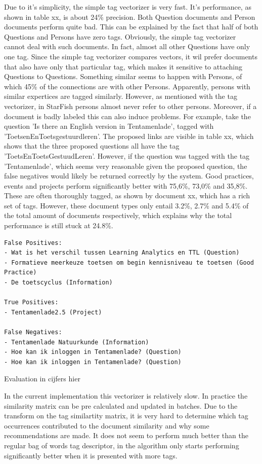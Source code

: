 Due to it's simplicity, the simple tag vectorizer is very fast. It's performance, as shown in table xx, is about 24\% precision. Both Question documents and Person documents perform quite bad. This can be explained by the fact that half of both Questions and Persons have zero tags. Obviously, the simple tag vectorizer cannot deal with such documents. In fact, almost all other Questions have only one tag. Since the simple tag vectorizer compares vectors, it wil prefer documents that also have only that particular tag, which makes it sensitive to attaching Questions to Questions. Something similar seems to happen with Persons, of which 45\% of the connections are with other Persons. Apparently, persons with similar expertices are tagged similarly. However, as mentioned with the tag vectorizer, in StarFish persons almost never refer to other persons. Moreover, if a document is badly labeled this can also induce problems. For example, take the question 'Is there an English version in Tentamenlade', tagged with 'ToetsenEnToetsgestuurdleren'. The proposed links are visible in table xx, which shows that  the three proposed questions all have the tag 'ToetsEnToetsGestuudLeren'. However, if the question was tagged with the tag 'Tentamenlade', which seems very reasonable given the proposed question, the false negatives would likely be returned correctly by the system. Good practices, events and projects perform significantly better with 75,6\%, 73,0\% and 35,8\%. These are often thoroughly tagged, as shown by document xx, which has a rich set of tags. However, these document types only entail 3.2\%, 2.7\% and 5.4\% of the total amount of documents respectively, which explains why the total performance is still stuck at 24.8\%. 

\begin{lstlisting}
False Positives:
- Wat is het verschil tussen Learning Analytics en TTL (Question)
- Formatieve meerkeuze toetsen om begin kennisniveau te toetsen (Good Practice)
- De toetscyclus (Information)

True Positives:
- Tentamenlade2.5 (Project)

False Negatives:
- Tentamenlade Natuurkunde (Information)
- Hoe kan ik inloggen in Tentamenlade? (Question)
- Hoe kan ik inloggen in Tentamenlade? (Question)
\end{lstlisting}

Evaluation in cijfers hier

In the current implementation this vectorizer is relatively slow. In practice the similarity matrix can be pre calculated and updated in batches. Due to the transform on the tag similartity matrix, it is very hard to determine which tag occurrences contributed to the document similarity and why some recommendations are made. It does not seem to perform much better than the regular bag of words tag descriptor, in \citeauthor{zhou2011web} the algorithm only starts performing significantly better when it is presented with more tags.

